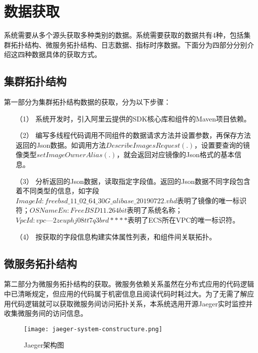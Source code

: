 \section{数据获取}\label{data-collect-way}
系统需要从多个源头获取多种类别的数据。系统需要获取的数据共有4种，包括集群拓扑结构、微服务拓扑结构、日志数据、指标时序数据。下面分为四部分分别介绍这四种数据具体的获取方式。
\subsection{集群拓扑结构}
第一部分为集群拓扑结构数据的获取，分为以下步骤：
\begin{itemize}
    \item [（1）]系统开发时，引入阿里云提供的SDK核心库和组件的Maven项目依赖。
    \item [（2）]编写多线程代码调用不同组件的数据请求方法并设置参数，再保存方法返回的Json数据。如调用方法$DescribeImagesRequest(.)$，设置要查询的镜像类型$setImageOwnerAlias(.)$，就会返回对应镜像的Json格式的基本信息。
    \item [（3）]分析返回的Json数据，读取指定字段值。返回的Json数据不同字段包含着不同类型的信息，如字段$ ImageId: freebsd\_11\_02\_64\_30G\_alibase\_20190722.vhd$表明了镜像的唯一标识符；$OSNameEn: FreeBSD  11.2 64 bit$表明了系统名称；$VpcId:vpc—2zeuphj08tt7q3brd****$表明了ECS所在VPC的唯一标识符。
    \item [（4）]按获取的字段信息构建实体属性列表，和组件间关联拓扑。
\end{itemize}

\subsection{微服务拓扑结构}
第二部分为微服务拓扑结构的获取。微服务依赖关系虽然在分布式应用的代码逻辑中已清晰规定，但应用的代码属于机密信息且阅读代码时耗过大。为了无需了解应用代码逻辑就可以获取微服务间访问拓扑关系，本系统选用开源Jaeger实时监控并收集微服务间的访问信息。
\begin{figure}[htbp]
    \centering
    \texttt{[image: jaeger-system-constructure.png]}
    \caption{Jaeger架构图\label{jaeger-system-constructure}}
\end{figure}

